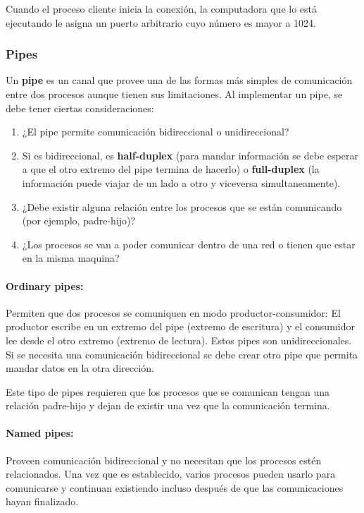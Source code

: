 Cuando el proceso cliente inicia la conexión, la computadora que lo está ejecutando le asigna un puerto arbitrario cuyo número es mayor a 1024.
\subsubsection{Pipes}
Un \textbf{pipe} es un canal que provee una de las formas más simples de comunicación entre dos procesos aunque tienen sus limitaciones. Al implementar un pipe, se debe tener ciertas consideraciones: 
\begin{enumerate}
	\item ¿El pipe permite comunicación bidireccional o unidireccional?
	\item Si es bidireccional, es \textbf{half-duplex} (para mandar información se debe esperar a que el otro extremo del pipe termina de hacerlo) o \textbf{full-duplex} (la información puede viajar de un lado a otro y viceversa simultaneamente).
	\item ¿Debe existir alguna relación entre los procesos que se están comunicando (por ejemplo, padre-hijo)?
	\item ¿Los procesos se van a poder comunicar dentro de una red o tienen que estar en la misma maquina?
\end{enumerate}

\paragraph{Ordinary pipes:} Permiten que dos procesos se comuniquen en modo productor-consumidor: El productor escribe en un extremo del pipe (extremo de escritura) y el consumidor lee desde el otro extremo (extremo de lectura). Estos pipes son unidireccionales. Si se necesita una comunicación bidireccional se debe crear otro pipe que permita mandar datos en la otra dirección.

Este tipo de pipes requieren que los procesos que se comunican tengan una relación padre-hijo y dejan de existir una vez que la comunicación termina.

\paragraph{Named pipes:} Proveen comunicación bidireccional y no necesitan que los procesos estén relacionados. Una vez que es establecido, varios procesos pueden usarlo para comunicarse y continuan existiendo incluso después de que las comunicaciones hayan finalizado.


